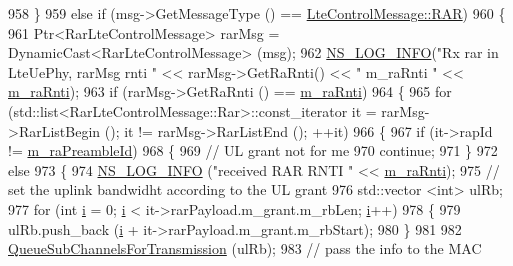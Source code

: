 \begin{DoxyCode}
958         \}
959       \textcolor{keywordflow}{else} \textcolor{keywordflow}{if} (msg->GetMessageType () == \hyperlink{classns3_1_1LteControlMessage_a9f9798d5aa8ad40f6432285b4b06135ba32e0d29cd217b256852ae7e843c932ed}{LteControlMessage::RAR})
960         \{
961           Ptr<RarLteControlMessage> rarMsg = DynamicCast<RarLteControlMessage> (msg);
962           \hyperlink{group__logging_gafbd73ee2cf9f26b319f49086d8e860fb}{NS\_LOG\_INFO}(\textcolor{stringliteral}{"Rx rar in LteUePhy, rarMsg rnti "} << rarMsg->GetRaRnti() << \textcolor{stringliteral}{" m\_raRnti "} 
      << \hyperlink{classns3_1_1LteUePhy_affe6f8e8fcf03482b57c92c74637cc4e}{m\_raRnti});
963           \textcolor{keywordflow}{if} (rarMsg->GetRaRnti () == \hyperlink{classns3_1_1LteUePhy_affe6f8e8fcf03482b57c92c74637cc4e}{m\_raRnti})
964             \{
965               \textcolor{keywordflow}{for} (std::list<RarLteControlMessage::Rar>::const\_iterator it = rarMsg->RarListBegin (); it !=
       rarMsg->RarListEnd (); ++it)
966                 \{
967                   \textcolor{keywordflow}{if} (it->rapId != \hyperlink{classns3_1_1LteUePhy_af3baaa1596e4ac3218a84129e65c1d78}{m\_raPreambleId})
968                     \{
969                       \textcolor{comment}{// UL grant not for me}
970                       \textcolor{keywordflow}{continue};
971                     \}
972                   \textcolor{keywordflow}{else}
973                     \{
974                       \hyperlink{group__logging_gafbd73ee2cf9f26b319f49086d8e860fb}{NS\_LOG\_INFO} (\textcolor{stringliteral}{"received RAR RNTI "} << \hyperlink{classns3_1_1LteUePhy_affe6f8e8fcf03482b57c92c74637cc4e}{m\_raRnti});
975                       \textcolor{comment}{// set the uplink bandwidht according to the UL grant}
976                       std::vector <int> ulRb;
977                       \textcolor{keywordflow}{for} (\textcolor{keywordtype}{int} \hyperlink{bernuolliDistribution_8m_a6f6ccfcf58b31cb6412107d9d5281426}{i} = 0; \hyperlink{bernuolliDistribution_8m_a6f6ccfcf58b31cb6412107d9d5281426}{i} < it->rarPayload.m\_grant.m\_rbLen; \hyperlink{bernuolliDistribution_8m_a6f6ccfcf58b31cb6412107d9d5281426}{i}++)
978                         \{
979                           ulRb.push\_back (\hyperlink{bernuolliDistribution_8m_a6f6ccfcf58b31cb6412107d9d5281426}{i} + it->rarPayload.m\_grant.m\_rbStart);
980                         \}
981 
982                       \hyperlink{classns3_1_1LteUePhy_a228ae97dfcf1f7eacf67817581be786b}{QueueSubChannelsForTransmission} (ulRb);
983                       \textcolor{comment}{// pass the info to the MAC}

\end{DoxyCode}
